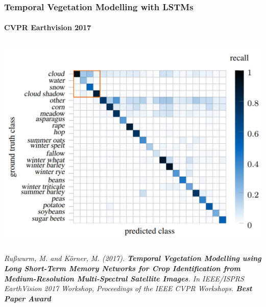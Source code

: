 
\begin{frame}
\frametitle{Temporal Vegetation Modelling with LSTMs}
\framesubtitle{CVPR Earthvision 2017}
\begin{columns}
	\figencoderfieldRNN
	\includegraphics[width=.8\textwidth]{images/confmat_fieldrnn}
\end{columns}

\vspace{1em}

\textsl{\small
	Rußwurm, M. and Körner, M. (2017). \textbf{Temporal Vegetation Modelling using Long Short-Term Memory Networks for Crop Identification from Medium-Resolution Multi-Spectral Satellite Images}. In IEEE/ISPRS EarthVision 2017 Workshop, Proceedings of the IEEE CVPR Workshops. \textbf{\color{tumorange} Best Paper Award}
}

\end{frame}



\def\fps{3}


